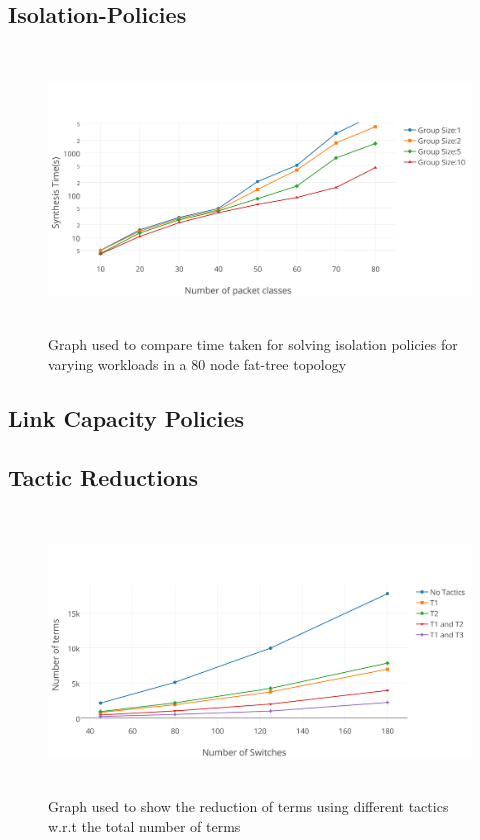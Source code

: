 \subsection{Isolation-Policies}
\begin{figure}
	\includegraphics[height=7.5cm]{figures/performance-isolation-groups-log-scale.png}
	\caption{Graph used to compare time taken for solving isolation policies for varying workloads in a 80 node fat-tree topology}
	\label{fig:isolation}
\end{figure}

\subsection{Link Capacity Policies}


\subsection{Tactic Reductions}
\begin{figure}
	\includegraphics[height=7.5cm]{figures/tactic-reduction.png}
	\caption{Graph used to show the reduction of terms using different tactics w.r.t the total number of terms}
	\label{fig:tactic-reduction}
\end{figure}

